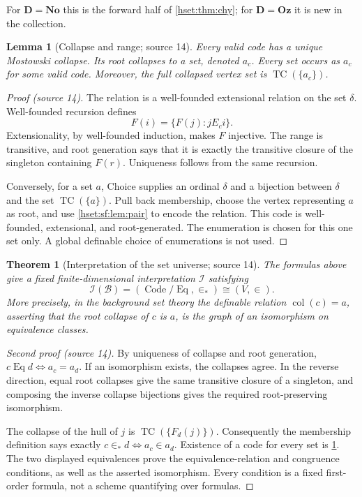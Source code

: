 \documentclass[11pt,letterpaper]{article}
\newtheorem{theorem}{Theorem}[section]
\newtheorem{lemma}[lemma]{Lemma}\aliascntresetthe{lemma}
\theoremstyle{definition}
\theoremstyle{remark}
\newcommand{\No}{\mathbf{No}}
\newcommand{\TC}{\operatorname{TC}}
\newcommand{\B}{\mathcal B}
\newcommand{\I}{\mathcal I}
\newcommand{\Code}{\operatorname{Code}}
\newcommand{\Oz}{\mathbf{Oz}}
\newcommand{\Eqc}{\operatorname{Eq}}
\newcommand{\Dd}{\mathbf{D}}
\begin{document}
For $\Dd=\No$ this is the forward half of \cref{hset:thm:chy}; for $\Dd=\Oz$ it is
new in the collection.

\begin{lemma}[Collapse and range; source 14]\label{hset:sf:lem:collapse}
Every valid code has a unique Mostowski collapse. Its root collapses to a set,
denoted $a_c$. Every set occurs as $a_c$ for some valid code. Moreover, the full
collapsed vertex set is $\TC(\{a_c\})$.
\end{lemma}
\begin{proof}[Proof (source 14)]
The relation is a well-founded extensional relation on the set $\delta$.
Well-founded recursion defines
\[
 F(i)=\{F(j):jE_ci\}.
\]
Extensionality, by well-founded induction, makes $F$ injective. The range is
transitive, and root generation says that it is exactly the transitive closure of
the singleton containing $F(r)$. Uniqueness follows from the same recursion.

Conversely, for a set $a$, Choice supplies an ordinal $\delta$ and a bijection
between $\delta$ and the set $\TC(\{a\})$. Pull back membership, choose the vertex
representing $a$ as root, and use \cref{hset:sf:lem:pair} to encode the relation.
This code is well-founded, extensional, and root-generated. The enumeration is
chosen for this one set only. A global definable choice of enumerations is not
used.
\end{proof}

\begin{theorem}[Interpretation of the set universe; source 14]\label{hset:sf:thm:setinterpret}
The formulas above give a fixed finite-dimensional interpretation $\I$ satisfying
\[
 \I(\B)=(\Code/{\Eqc},\in_*)\cong(V,\in).
\]
More precisely, in the background set theory the definable relation
$\operatorname{col}(c)=a$, asserting that the root collapse of $c$ is $a$, is the
graph of an isomorphism on equivalence classes.
\end{theorem}
\begin{proof}[Second proof (source 14)]
By uniqueness of collapse and root generation,
$c\mathrel{\Eqc}d\iff a_c=a_d$. If an isomorphism exists, the collapses agree. In
the reverse direction, equal root collapses give the same transitive closure of a
singleton, and composing the inverse collapse bijections gives the required
root-preserving isomorphism.

The collapse of the hull of $j$ is $\TC(\{F_d(j)\})$. Consequently the membership
definition says exactly $c\in_*d\iff a_c\in a_d$. Existence of a code for every set
is \cref{hset:sf:lem:collapse}. The two displayed equivalences prove the
equivalence-relation and congruence conditions, as well as the asserted
isomorphism. Every condition is a fixed first-order formula, not a scheme
quantifying over formulas.
\end{proof}
\end{document}
